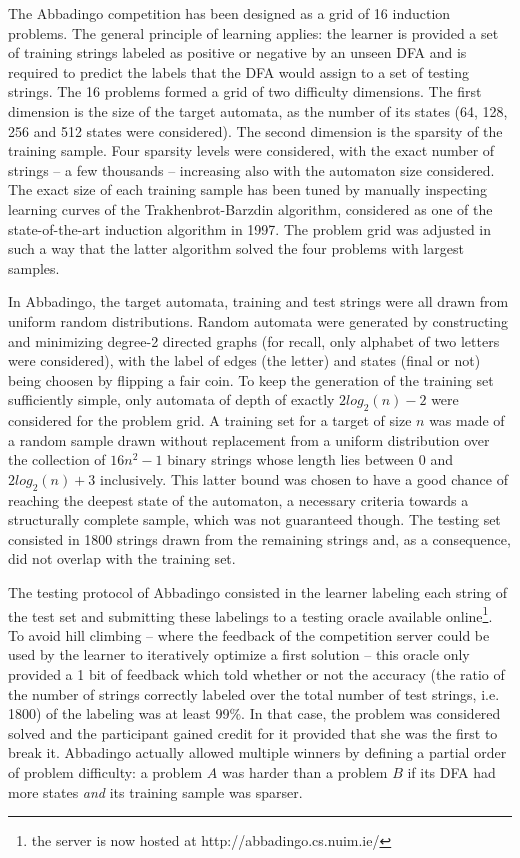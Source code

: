 The Abbadingo competition has been designed as a grid of 16 induction problems. The general principle of learning applies: the learner is provided a set of training strings labeled as positive or negative by an unseen DFA and is required to predict the labels that the DFA would assign to a set of testing strings. The 16 problems formed a grid of two difficulty dimensions. The first dimension is the size of the target automata, as the number of its states (64, 128, 256 and 512 states were considered). The second dimension is the sparsity of the training sample. Four sparsity levels were considered, with the exact number of strings -- a few thousands -- increasing also with the automaton size considered. The exact size of each training sample has been tuned by manually inspecting learning curves of the Trakhenbrot-Barzdin algorithm, considered as one of the state-of-the-art induction algorithm in 1997. The problem grid was adjusted in such a way that the latter algorithm solved the four problems with largest samples.

In Abbadingo, the target automata, training and test strings were all drawn from uniform random distributions. Random automata were generated by constructing and minimizing degree-2 directed graphs (for recall, only alphabet of two letters were considered), with the label of edges (the letter) and states (final or not) being choosen by flipping a fair coin. To keep the generation of the training set sufficiently simple, only automata of depth of exactly $2log_2(n)-2$ were considered for the problem grid. A training set for a target of size $n$ was made of a random sample drawn without replacement from a uniform distribution over the collection of $16n^2 -1$ binary strings whose length lies between 0 and $2log_2(n)+3$ inclusively. This latter bound was chosen to have a good chance of reaching the deepest state of the automaton, a necessary criteria towards a structurally complete sample, which was not guaranteed though. The testing set consisted in 1800 strings drawn from the remaining strings and, as a consequence, did not overlap with the training set.

The testing protocol of Abbadingo consisted in the learner labeling each string of the test set and submitting these labelings to a testing oracle available online\footnote{the server is now hosted at http://abbadingo.cs.nuim.ie/}. To avoid hill climbing -- where the feedback of the competition server could be used by the learner to iteratively optimize a first solution -- this oracle only provided a 1 bit of feedback which told whether or not the accuracy (the ratio of the number of strings correctly labeled over the total number of test strings, i.e. 1800) of the labeling was at least 99\%. In that case, the problem was considered solved and the participant gained credit for it provided that she was the first to break it. Abbadingo actually allowed multiple winners by defining a partial order of problem difficulty: a problem $A$ was harder than a problem $B$ if its DFA had more states \emph{and} its training sample was sparser. 


